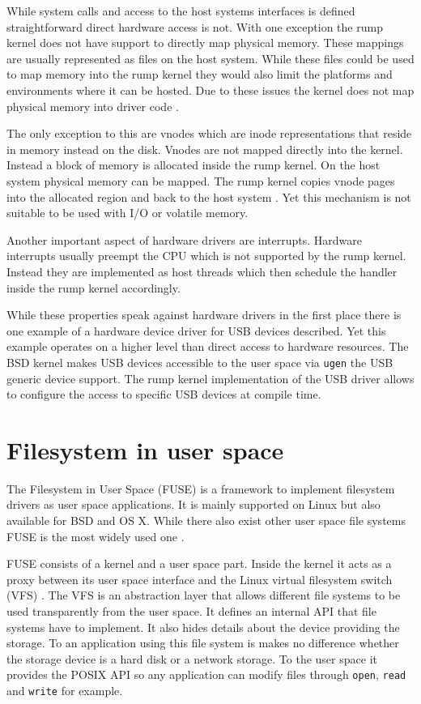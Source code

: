 \documentclass[
a4paper,
11pt,
twoside
]{report}
\begin{document}
		While system calls and access to the host systems interfaces is defined straightforward direct hardware access is not.
		With one exception the rump kernel does not have support to directly map physical memory.
		These mappings are usually represented as files on the host system.
		While these files could be used to map memory into the rump kernel they would also limit the platforms and environments where it can be hosted.
		Due to these issues the kernel does not map physical memory into driver code \citep{kantee}.
		
		The only exception to this are vnodes which are inode representations that reside in memory instead on the disk.
		Vnodes are not mapped directly into the kernel.
		Instead a block of memory is allocated inside the rump kernel.
		On the host system physical memory can be mapped.
		The rump kernel copies vnode pages into the allocated region and back to the host system \citep{kantee}.
		Yet this mechanism is not suitable to be used with I/O or volatile memory.
		
		Another important aspect of hardware drivers are interrupts.
		Hardware interrupts usually preempt the CPU which is not supported by the rump kernel.
		Instead they are implemented as host threads which then schedule the handler inside the rump kernel accordingly. \citep{kantee}
		
		While these properties speak against hardware drivers in the first place there is one example of a hardware device driver for USB devices described.
		Yet this example operates on a higher level than direct access to hardware resources.
		The BSD kernel makes USB devices accessible to the user space via \texttt{ugen} the USB generic device support.
		The rump kernel implementation of the USB driver allows to configure the access to specific USB devices at compile time. \citep{kantee} \citep{ugen}
		
		\section{Filesystem in user space}
		
		The Filesystem in User Space (FUSE) \citep{fuse} is a framework to implement filesystem drivers as user space applications.
		It is mainly supported on Linux but also available for BSD and OS X.
		While there also exist other user space file systems FUSE is the most widely used one \citep{202324}.
	
		FUSE consists of a kernel and a user space part.
		Inside the kernel it acts as a proxy between its user space interface and the Linux virtual filesystem switch (VFS) \citep{202324}.
		The VFS is an abstraction layer that allows different file systems to be used transparently from the user space.
		It defines an internal API that file systems have to implement.
		It also hides details about the device providing the storage.
		To an application using this file system is makes no difference whether the storage device is a hard disk or a network storage.
		To the user space it provides the POSIX API so any application can modify files through \texttt{open}, \texttt{read} and \texttt{write} for example. \citep{ibmvfs}
		
\end{document}
